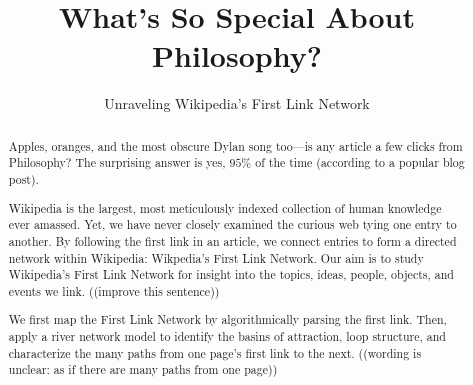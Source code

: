 \documentclass[twoside]{article}
\title{\vspace{-5mm}%
	\fontsize{24pt}{12pt}\selectfont
	\textbf{What's So Special About Philosophy?} 
	}
\author{%
\fontsize{14pt}{14pt}\selectfont
	Unraveling Wikipedia's First Link Network \vspace{-2mm}\\
	}
\date{}
\newcommand{\red}[1]{{\leavevmode\color{sred}{#1}}} %
\begin{document}
\maketitle
\thispagestyle{fancy}
\begin{abstract}
\fontsize{12pt}{12pt}
\selectfont
\noindent Apples, oranges, and the most obscure Dylan song too---is any article a few clicks from Philosophy? The surprising answer is yes, $95\%$ of the time (according to a popular blog post).

Wikipedia is the largest, most meticulously indexed collection of human knowledge ever amassed. Yet, we have never closely examined the curious web tying one entry to another. By following the first link in an article, we connect entries to form a directed network within Wikipedia: Wikpedia's First Link Network. Our aim is to study Wikipedia's First Link Network for insight into the topics, ideas, people, objects, and events we link. ((improve this sentence))

We first map the First Link Network by algorithmically parsing the first link. Then, apply a river network model to identify the basins of attraction, loop structure, and characterize the many paths from one page's first link to the next. ((wording is unclear: as if there are many paths from one page))

\red{rewrite abstract}

\end{abstract}

\end{document}
